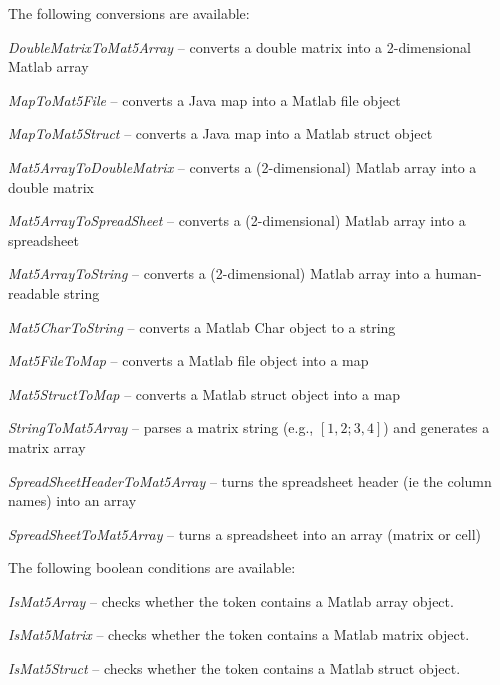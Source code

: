 \documentclass[a4paper]{book}
\begin{document}
The following conversions are available:
\begin{tight_itemize}
  \item \textit{DoubleMatrixToMat5Array} -- converts a double matrix into a 2-dimensional Matlab array
  \item \textit{MapToMat5File} -- converts a Java map into a Matlab file object
  \item \textit{MapToMat5Struct} -- converts a Java map into a Matlab struct object
  \item \textit{Mat5ArrayToDoubleMatrix} -- converts a (2-dimensional) Matlab array into a double matrix
  \item \textit{Mat5ArrayToSpreadSheet} -- converts a (2-dimensional) Matlab array into a spreadsheet
  \item \textit{Mat5ArrayToString} -- converts a (2-dimensional) Matlab array into a human-readable string
  \item \textit{Mat5CharToString} -- converts a Matlab Char object to a string
  \item \textit{Mat5FileToMap} -- converts a Matlab file object into a map
  \item \textit{Mat5StructToMap} -- converts a Matlab struct object into a map
  \item \textit{StringToMat5Array} -- parses a matrix string (e.g., $[1, 2; 3, 4]$) and generates a matrix array
  \item \textit{SpreadSheetHeaderToMat5Array} -- turns the spreadsheet header (ie the column names) into an array
  \item \textit{SpreadSheetToMat5Array} -- turns a spreadsheet into an array (matrix or cell)
\end{tight_itemize}

The following boolean conditions are available:
\begin{tight_itemize}
  \item \textit{IsMat5Array} -- checks whether the token contains a Matlab array object.
  \item \textit{IsMat5Matrix} -- checks whether the token contains a Matlab matrix object.
  \item \textit{IsMat5Struct} -- checks whether the token contains a Matlab struct object.
\end{tight_itemize}



\end{document}
